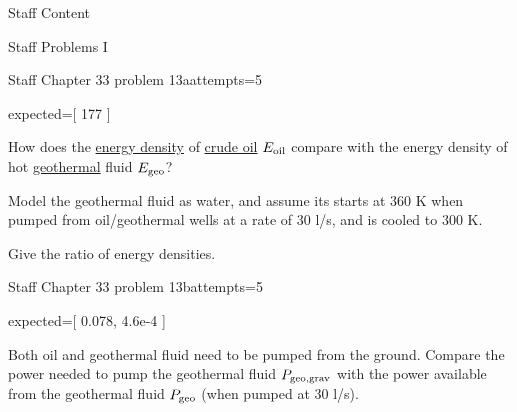 {\begin{edXchapter}{Staff Content}
\begin{edXsection}{Staff Problems I}
\begin{edXvertical}
\begin{edXproblem}{Staff Chapter 33 problem 13a}{attempts=5}
\begin{edXscript}
expected=[ 177 ]
\end{edXscript}


How does the \href{http://en.wikipedia.org/wiki/Energy_density}{energy
  density} of \href{http://en.wikipedia.org/wiki/Petroleum}{crude oil}
$E_{\rm oil}$ compare with the energy density of hot
\href{http://en.wikipedia.org/wiki/Geothermal_energy}{geothermal}
fluid $E_{\rm geo}$?

Model the geothermal fluid as water, and assume its starts at 360 K
when pumped from oil/geothermal wells at a rate of 30 l/s, and is
cooled to 300 K.

Give the ratio of energy densities.

  
 

\end{edXproblem}

\begin{edXproblem}{Staff Chapter 33 problem 13b}{attempts=5}

\begin{edXscript}
expected=[ 0.078, 4.6e-4 ]
\end{edXscript}


Both oil and geothermal fluid need to be pumped from the ground.
Compare the power needed to pump the geothermal fluid $P_{\rm geo, grav}$ with the power
available from the geothermal fluid $P_{\rm geo}$ (when pumped at 30
l/s).


\end{edXproblem}
\end{edXvertical}
\end{edXsection}
\end{edXchapter}}
